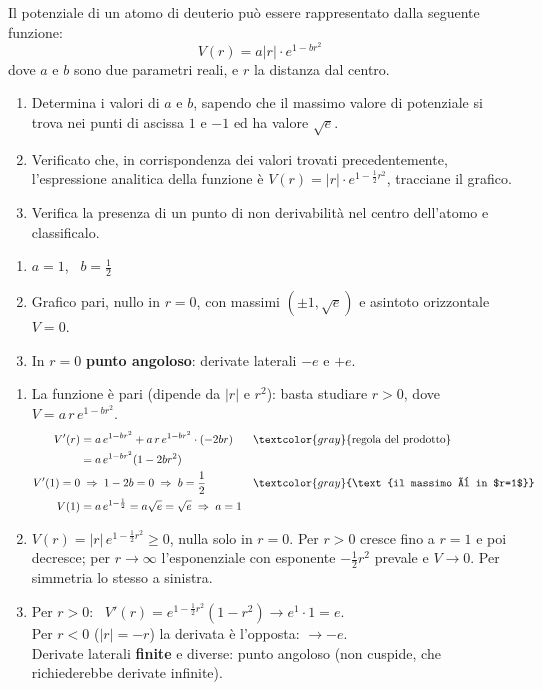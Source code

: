 \begin{question}[ID=3.3, subtitle={Potenziale del deuterio: $V(r)=a|r|e^{1-br^2}$}, tags={studio di funzione, parametrico, fisica}, difficulty=difficile]
Il potenziale di un atomo di deuterio può essere rappresentato dalla seguente funzione:
\begin{equation*}
    V(r) = a|r|\cdot e^{1-br^2}
\end{equation*}
dove $a$ e $b$ sono due parametri reali, e $r$ la distanza dal centro.
\begin{enumerate}
    \item Determina i valori di $a$ e $b$, sapendo che il massimo valore di potenziale si trova nei punti di ascissa $1$ e $-1$ ed ha valore $\sqrt{e}$.
    \item Verificato che, in corrispondenza dei valori trovati precedentemente, l'espressione analitica della funzione è $V(r) = |r| \cdot e^{1-\frac{1}{2}r^2}$, tracciane il grafico.
    \item Verifica la presenza di un punto di non derivabilità nel centro dell'atomo e classificalo.
\end{enumerate}
\begin{solution}
\begin{enumerate}
    \item $a=1$, \ $b=\tfrac12$
    \item Grafico pari, nullo in $r=0$, con massimi $(\pm1,\sqrt e)$ e asintoto orizzontale $V=0$.
    \item In $r=0$ \textbf{punto angoloso}: derivate laterali $-e$ e $+e$.
\end{enumerate}
\end{solution}
\begin{explanation}
\begin{enumerate}
    \item La funzione è pari (dipende da $|r|$ e $r^2$): basta studiare $r>0$, dove $V=a\,r\,e^{1-br^2}$.
    \[\begin{aligned}
    V'(r) &= a\,e^{1-br^2}+a\,r\,e^{1-br^2}\cdot(-2br) && \textcolor{gray}{\text{regola del prodotto}}\\
    &= a\,e^{1-br^2}(1-2br^2)\\
    V'(1)=0 &\;\Rightarrow\; 1-2b=0 \;\Rightarrow\; b=\dfrac12 && \textcolor{gray}{\text{il massimo è in $r=1$}}\\
    V(1) &= a\,e^{1-\frac12}=a\sqrt e=\sqrt e \;\Rightarrow\; a=1
    \end{aligned}\]
    \item $V(r)=|r|\,e^{1-\frac12r^2}\geq0$, nulla solo in $r=0$. Per $r>0$ cresce fino a $r=1$ e poi decresce; per $r\to\infty$ l'esponenziale con esponente $-\tfrac12r^2$ prevale e $V\to0$. Per simmetria lo stesso a sinistra.
    \item Per $r>0$: \ $V'(r)=e^{1-\frac12r^2}(1-r^2)\to e^1\cdot1=e$. \\
    Per $r<0$ ($|r|=-r$) la derivata è l'opposta: $\to-e$. \\
    Derivate laterali \textbf{finite} e diverse: punto angoloso (non cuspide, che richiederebbe derivate infinite).
\end{enumerate}
\end{explanation}
\end{question}

